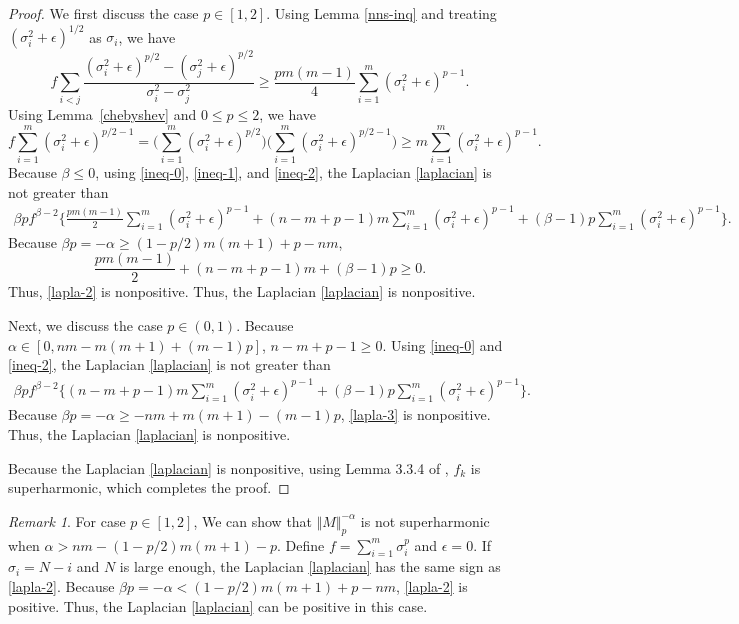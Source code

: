\documentclass[11pt, a4paper]{article}
\theoremstyle{remark}
\newtheorem{remark}{Remark}
\begin{document}
\begin{proof}
We first discuss the case $p\in[1,2]$. Using Lemma \ref{nns-inq} and treating $(\sigma_i^2+\epsilon)^{1/2}$ as $\sigma_i$, we have 
\begin{equation}
    f\sum_{i<j}\frac{(\sigma_i^2+\epsilon)^{p/2}-(\sigma_j^2+\epsilon)^{p/2}}{\sigma_i^2-\sigma_j^2}\ge\frac{pm(m-1)}{4}\sum_{i=1}^m(\sigma_i^2+\epsilon)^{p-1}. \label{ineq-1}
\end{equation}
Using Lemma~\ref{chebyshev} and $0\le p \le 2$, we have
\begin{equation}
    f\sum_{i=1}^m(\sigma_i^2+\epsilon)^{p/2-1}=\Big(\sum_{i=1}^m(\sigma_i^2+\epsilon)^{p/2}\Big)\Big(\sum_{i=1}^m(\sigma_i^2+\epsilon)^{p/2-1}\Big)\ge m\sum_{i=1}^m(\sigma_i^2+\epsilon)^{p-1}. \label{ineq-2}
\end{equation}
Because $\beta\le0$,
using \eqref{ineq-0}, \eqref{ineq-1}, and \eqref{ineq-2}, the Laplacian \eqref{laplacian} is not greater than
\begin{align}
    \beta pf^{\beta-2}\Big\{\frac{pm(m-1)}{2}\sum_{i=1}^m(\sigma_i^2+\epsilon)^{p-1}+(n-m+p-1)m\sum_{i=1}^m(\sigma_i^2+\epsilon)^{p-1}+(\beta-1)p\sum_{i=1}^m(\sigma_i^2+\epsilon)^{p-1} \Big\}. \label{lapla-2}
\end{align}
Because $\beta p=-\alpha\ge (1-p/2)m(m+1)+p-nm$, $$\frac{pm(m-1)}{2}+(n-m+p-1)m+(\beta-1)p\ge0.$$ Thus, \eqref{lapla-2} is nonpositive. Thus, the Laplacian \eqref{laplacian} is nonpositive.

Next, we discuss the case $p\in(0,1)$. Because $\alpha\in[0,nm-m(m+1)+(m-1)p]$, $n-m+p-1\ge0$. Using \eqref{ineq-0} and \eqref{ineq-2}, the Laplacian \eqref{laplacian} is not greater than
\begin{align}
    \beta pf^{\beta-2}\Big\{(n-m+p-1)m\sum_{i=1}^m(\sigma_i^2+\epsilon)^{p-1}+(\beta-1)p\sum_{i=1}^m(\sigma_i^2+\epsilon)^{p-1} \Big\}. \label{lapla-3}
\end{align}
Because $\beta p=-\alpha\ge -nm+m(m+1)-(m-1)p$, \eqref{lapla-3} is nonpositive. Thus, the Laplacian \eqref{laplacian} is nonpositive.

Because the Laplacian \eqref{laplacian} is nonpositive, using  Lemma 3.3.4 of \cite{helms2009potential}, $f_k$ is superharmonic, which completes the proof.
\end{proof}

\begin{remark}
    For case $p\in[1,2]$, We can show that $\Vert M\Vert_{p}^{-\alpha}$ is not superharmonic when $\alpha>nm-(1-p/2)m(m+1)-p$. Define $f=\sum_{i=1}^m\sigma_i^p$ and $\epsilon=0$. If $\sigma_i=N-i$ and $N$ is large enough, the Laplacian \eqref{laplacian} has the same sign as \eqref{lapla-2}. Because $\beta p=-\alpha<(1-p/2)m(m+1)+p-nm$, \eqref{lapla-2} is positive. Thus, the Laplacian \eqref{laplacian} can be positive in this case.
\end{remark}
\end{document}
